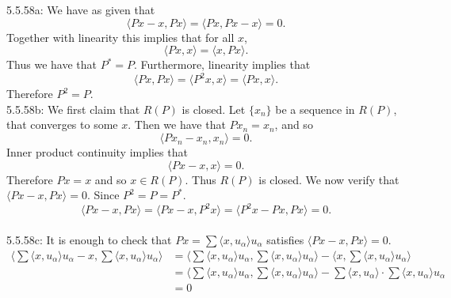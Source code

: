\documentclass[letterpaper]{article}
\newcommand{\lan}{\langle}
\newcommand{\ran}{\rangle}
\newcommand{\inn}[1]{\lan#1\ran}
\begin{document}
 5.5.58a: We have as given that $$ \inn{Px-x , Px} =\inn{Px, Px-x} =0.$$
Together with linearity this implies that for all $x$, $$\inn{Px,x} = \inn{x,Px}.$$ Thus we have that $P^\ast = P$. Furthermore, linearity implies that 
$$\inn{Px,Px} = \inn{P^2x,x} = \inn{Px,x}.$$ Therefore $P^2 = P.$
\newline \\ 5.5.58b: We first claim that $R(P)$ is closed. Let $\{x_n\}$ be a sequence in $R(P)$, that converges to some $x$. Then we have that $Px_n = x_n$, and so $$\inn{Px_n - x_n, x_n} = 0. $$ Inner product continuity implies that $$\inn{Px - x, x} = 0.$$ Therefore $Px=x$ and so $x\in R(P).$ Thus $R(P)$ is closed. We now verify that $\inn{Px-x, Px} =0$. Since $P^2 = P = P^\ast$.
$$\inn{Px-x,Px} = \inn{Px-x, P^2x} = \inn{P^2x - Px, Px} = 0.$$
\newline \\ 5.5.58c: It is enough to check that $Px = \sum\inn{x,u_\alpha} u_\alpha$ satisfies $\inn{Px-x, Px} = 0$.
\begin{align*} \inn{\sum\inn{x,u_\alpha} u_\alpha - x , \sum\inn{x,u_\alpha} u_\alpha} 
    &= \inn{ \sum\inn{x,u_\alpha} u_\alpha , \sum\inn{x,u_\alpha} u_\alpha} - \inn{x, \sum\inn{x,u_\alpha} u_\alpha} 
    \\ &  = \inn{\sum\inn{x,u_\alpha} u_\alpha, \sum\inn{x,u_\alpha} u_\alpha} - \sum \inn{x,u_\alpha}\cdot \sum\inn{x,u_\alpha} u_\alpha 
    \\ & = 0
\end{align*}
\end{document}
